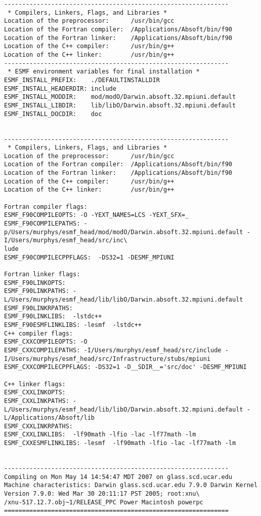 \begin{verbatim}
--------------------------------------------------------------
 * Compilers, Linkers, Flags, and Libraries *
Location of the preprocessor:      /usr/bin/gcc
Location of the Fortran compiler:  /Applications/Absoft/bin/f90
Location of the Fortran linker:    /Applications/Absoft/bin/f90
Location of the C++ compiler:      /usr/bin/g++
Location of the C++ linker:        /usr/bin/g++
--------------------------------------------------------------
 * ESMF environment variables for final installation *
ESMF_INSTALL_PREFIX:    ./DEFAULTINSTALLDIR
ESMF_INSTALL_HEADERDIR: include
ESMF_INSTALL_MODDIR:    mod/modO/Darwin.absoft.32.mpiuni.default
ESMF_INSTALL_LIBDIR:    lib/libO/Darwin.absoft.32.mpiuni.default
ESMF_INSTALL_DOCDIR:    doc


--------------------------------------------------------------
 * Compilers, Linkers, Flags, and Libraries *
Location of the preprocessor:      /usr/bin/gcc
Location of the Fortran compiler:  /Applications/Absoft/bin/f90
Location of the Fortran linker:    /Applications/Absoft/bin/f90
Location of the C++ compiler:      /usr/bin/g++
Location of the C++ linker:        /usr/bin/g++

Fortran compiler flags:
ESMF_F90COMPILEOPTS: -O -YEXT_NAMES=LCS -YEXT_SFX=_
ESMF_F90COMPILEPATHS: -p/Users/murphys/esmf_head/mod/modO/Darwin.absoft.32.mpiuni.default -I/Users/murphys/esmf_head/src/inc\
lude
ESMF_F90COMPILECPPFLAGS:  -DS32=1 -DESMF_MPIUNI

Fortran linker flags:
ESMF_F90LINKOPTS:
ESMF_F90LINKPATHS: -L/Users/murphys/esmf_head/lib/libO/Darwin.absoft.32.mpiuni.default
ESMF_F90LINKRPATHS:
ESMF_F90LINKLIBS:  -lstdc++
ESMF_F90ESMFLINKLIBS: -lesmf  -lstdc++
C++ compiler flags:
ESMF_CXXCOMPILEOPTS: -O
ESMF_CXXCOMPILEPATHS: -I/Users/murphys/esmf_head/src/include -I/Users/murphys/esmf_head/src/Infrastructure/stubs/mpiuni
ESMF_CXXCOMPILECPPFLAGS: -DS32=1 -D__SDIR__='src/doc' -DESMF_MPIUNI

C++ linker flags:
ESMF_CXXLINKOPTS:
ESMF_CXXLINKPATHS: -L/Users/murphys/esmf_head/lib/libO/Darwin.absoft.32.mpiuni.default -L/Applications/Absoft/lib
ESMF_CXXLINKRPATHS:
ESMF_CXXLINKLIBS:  -lf90math -lfio -lac -lf77math -lm
ESMF_CXXESMFLINKLIBS: -lesmf  -lf90math -lfio -lac -lf77math -lm


--------------------------------------------------------------
Compiling on Mon May 14 14:54:47 MDT 2007 on glass.scd.ucar.edu
Machine characteristics: Darwin glass.scd.ucar.edu 7.9.0 Darwin Kernel Version 7.9.0: Wed Mar 30 20:11:17 PST 2005; root:xnu\
/xnu-517.12.7.obj~1/RELEASE_PPC Power Macintosh powerpc
==============================================================
\end{verbatim}



